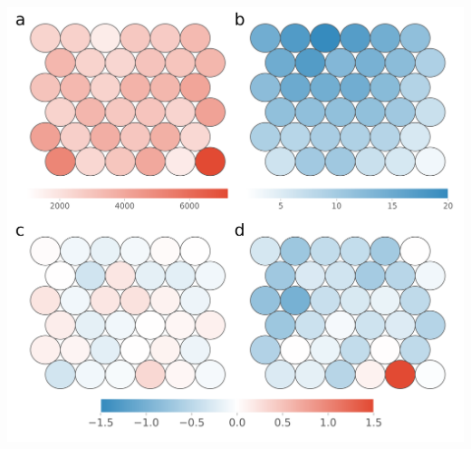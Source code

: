 \documentclass[12pt,a4paper,]{report}
\let\origfigure=\figure
\let\endorigfigure=\endfigure
\renewenvironment{figure}[1][2] {
    \expandafter\origfigure\expandafter[H]
} {
    \endorigfigure
}
\begin{document}
\begin{figure}[htbp]
\centering
\includegraphics[width=\textwidth,height=562pt,keepaspectratio]{chapter_5/figures/som_enrichment.png}
\caption[Self Organising Maps demonstrate NMM downregulated genes contain specific PG4 types.]{\textbf{Self   Organising   Maps   demonstrate   NMM   downregulated   genes   contain   specific   PG4   types.}   Self   Organising   Map   (SOM)   plots   for   clustering   of   Quadparser   predicted   two   tetrad   PG4s   by   loop   length.   In   each   figure,   each   circle   represents   a   cluster   of   similar   PG4s.   \textbf{a)}   SOM   plot   coloured   by   cluster   size.   Each   cluster   contained   between   1000   and   8000   PG4s.   \textbf{b)}   SOM   plot   coloured   by   total   length   in   bases   of   all   loops.   \textbf{c)}   and   \textbf{d)}   Log2   fold   enrichment   of   each   cluster   in   the   gene   bodies   of   genes   downregulated   by   NMM,   on   the   coding   and   template   strands,   respectively.   Log2   fold   enrichments   were   generated   by   comparing   actual   overlap   of   PG4s   with   downregulated   genes,   with   expected   overlap   when   PG4s   were   permuted   amongst   all   genes.   \label{som}}
\end{figure}
\end{document}
